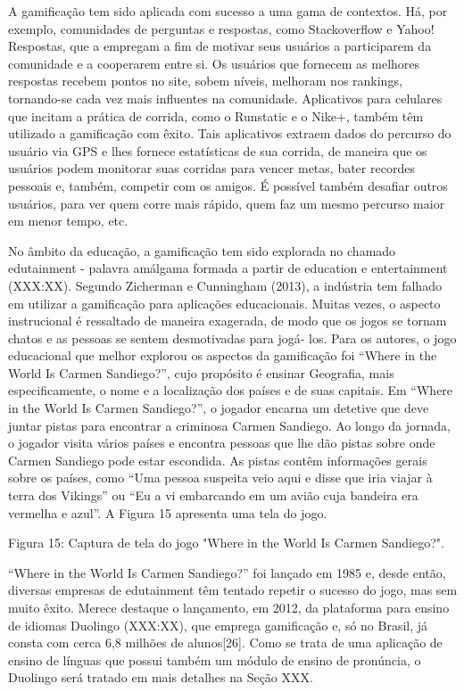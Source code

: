 A gamifica\c{c}\~ao tem sido aplicada com sucesso a uma gama de contextos. H\'a,
por exemplo, comunidades de perguntas e respostas, como Stackoverflow e
Yahoo! Respostas, que a empregam a fim de motivar seus usu\'arios a
participarem da comunidade e a cooperarem entre si. Os usu\'arios que
fornecem as melhores respostas recebem pontos no site, sobem n\'iveis,
melhoram nos rankings, tornando-se cada vez mais influentes na
comunidade. Aplicativos para celulares que incitam a pr\'atica de corrida,
como o Runstatic e o Nike+, tamb\'em t\^em utilizado a gamifica\c{c}\~ao com
\^exito. Tais aplicativos extraem dados do percurso do usu\'ario via GPS e
lhes fornece estat\'isticas de sua corrida, de maneira que os usu\'arios
podem monitorar suas corridas para vencer metas, bater recordes pessoais
e, tamb\'em, competir com os amigos. \'E poss\'ivel tamb\'em desafiar outros
usu\'arios, para ver quem corre mais r\'apido, quem faz um mesmo percurso
maior em menor tempo, etc.

No \^ambito da educa\c{c}\~ao, a gamifica\c{c}\~ao tem sido explorada no chamado
edutainment - palavra am\'algama formada a partir de education e
entertainment (XXX:XX). Segundo Zicherman e Cunningham (2013), a
ind\'ustria tem falhado em utilizar a gamifica\c{c}\~ao para aplica\c{c}\~oes
educacionais. Muitas vezes, o aspecto instrucional \'e ressaltado de
maneira exagerada, de modo que os jogos se tornam chatos e as pessoas se
sentem desmotivadas para jog\'a- los. Para os autores, o jogo educacional
que melhor explorou os aspectos da gamifica\c{c}\~ao foi ``Where in the World
Is Carmen Sandiego?'', cujo prop\'osito \'e ensinar Geografia, mais
especificamente, o nome e a localiza\c{c}\~ao dos pa\'ises e de suas capitais.
Em ``Where in the World Is Carmen Sandiego?'', o jogador encarna um
detetive que deve juntar pistas para encontrar a criminosa Carmen
Sandiego. Ao longo da jornada, o jogador visita v\'arios pa\'ises e encontra
pessoas que lhe d\~ao pistas sobre onde Carmen Sandiego pode estar
escondida. As pistas cont\^em informa\c{c}\~oes gerais sobre os pa\'ises, como
``Uma pessoa suspeita veio aqui e disse que iria viajar à terra dos
Vikings'' ou ``Eu a vi embarcando em um avi\~ao cuja bandeira era vermelha
e azul''. A Figura 15 apresenta uma tela do jogo.

 Figura 15: Captura de tela do jogo "Where in the World Is Carmen
 Sandiego?".

``Where in the World Is Carmen Sandiego?'' foi lan\c{c}ado em 1985 e, desde
ent\~ao, diversas empresas de edutainment t\^em tentado repetir o sucesso do
jogo, mas sem muito \^exito. Merece destaque o lan\c{c}amento, em 2012, da
plataforma para ensino de idiomas Duolingo (XXX:XX), que emprega
gamifica\c{c}\~ao e, s\'o no Brasil, j\'a consta com cerca 6,8 milh\~oes de
alunos{[}26{]}. Como se trata de uma aplica\c{c}\~ao de ensino de l\'inguas que
possui tamb\'em um m\'odulo de ensino de pron\'uncia, o Duolingo ser\'a tratado
em mais detalhes na Se\c{c}\~ao XXX.

